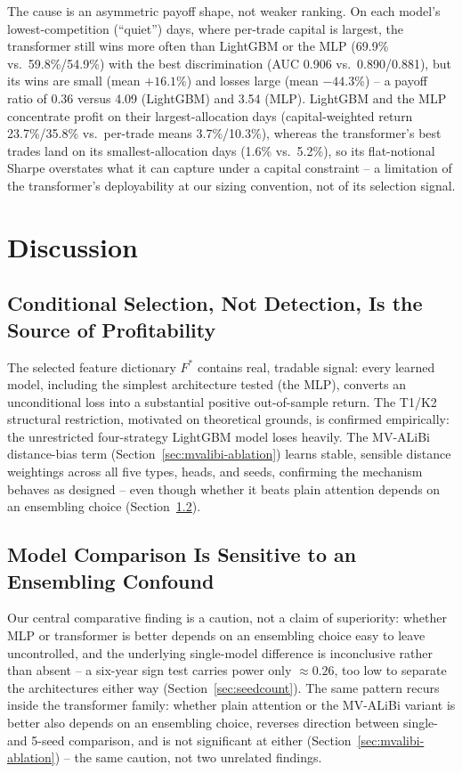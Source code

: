 \documentclass[sigconf,review]{acmart}
\begin{document}
The cause is an asymmetric payoff shape, not weaker ranking. On each model's lowest-competition (``quiet'') days, where per-trade capital is largest, the transformer still wins more often than LightGBM or the MLP (69.9\% vs.\ 59.8\%/54.9\%) with the best discrimination (AUC 0.906 vs.\ 0.890/0.881), but its wins are small (mean $+16.1\%$) and losses large (mean $-44.3\%$) -- a payoff ratio of 0.36 versus 4.09 (LightGBM) and 3.54 (MLP). LightGBM and the MLP concentrate profit on their largest-allocation days (capital-weighted return 23.7\%/35.8\% vs.\ per-trade means 3.7\%/10.3\%), whereas the transformer's best trades land on its smallest-allocation days (1.6\% vs.\ 5.2\%), so its flat-notional Sharpe overstates what it can capture under a capital constraint -- a limitation of the transformer's deployability at our sizing convention, not of its selection signal.

\section{Discussion}
\label{sec:discussion}

\subsection{Conditional Selection, Not Detection, Is the Source of Profitability}
The selected feature dictionary $F^{\ast}$ contains real, tradable signal: every learned model, including the simplest architecture tested (the MLP), converts an unconditional loss into a substantial positive out-of-sample return. The T1/K2 structural restriction, motivated on theoretical grounds, is confirmed empirically: the unrestricted four-strategy LightGBM model loses heavily. The MV-ALiBi distance-bias term (Section~\ref{sec:mvalibi-ablation}) learns stable, sensible distance weightings across all five types, heads, and seeds, confirming the mechanism behaves as designed -- even though whether it beats plain attention depends on an ensembling choice (Section~\ref{sec:ensembling-discussion}).

\subsection{Model Comparison Is Sensitive to an Ensembling Confound}
\label{sec:ensembling-discussion}
Our central comparative finding is a caution, not a claim of superiority: whether MLP or transformer is better depends on an ensembling choice easy to leave uncontrolled, and the underlying single-model difference is inconclusive rather than absent -- a six-year sign test carries power only $\approx0.26$, too low to separate the architectures either way (Section~\ref{sec:seedcount}). The same pattern recurs inside the transformer family: whether plain attention or the MV-ALiBi variant is better also depends on an ensembling choice, reverses direction between single- and 5-seed comparison, and is not significant at either (Section~\ref{sec:mvalibi-ablation}) -- the same caution, not two unrelated findings.
\end{document}
